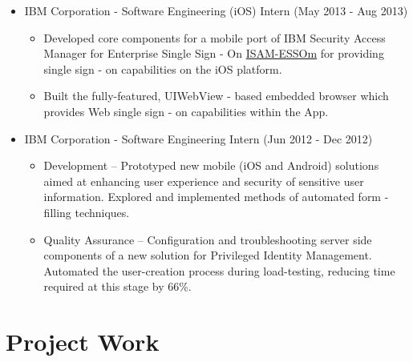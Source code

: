\begin{itemize}
\tightlist
\item
  IBM Corporation - Software Engineering (iOS) Intern \hfill (May 2013 -
  Aug 2013)

  \begin{itemize}
  \tightlist
  \item
    Developed core components for a mobile port of IBM Security Access
    Manager for Enterprise Single Sign - On
    \href{https://itunes.apple.com/us/app/isam-essom/id741972716?mt=8}{ISAM-ESSOm}
    for providing single sign - on capabilities on the iOS platform.
  \item
    Built the fully-featured, UIWebView - based embedded browser which
    provides Web single sign - on capabilities within the App.
  \end{itemize}
\item
  IBM Corporation - Software Engineering Intern \hfill (Jun 2012 - Dec
  2012)

  \begin{itemize}
  \tightlist
  \item
    Development -- Prototyped new mobile (iOS and Android) solutions
    aimed at enhancing user experience and security of sensitive user
    information. Explored and implemented methods of automated form -
    filling techniques.
  \item
    Quality Assurance -- Configuration and troubleshooting server side
    components of a new solution for Privileged Identity Management.
    Automated the user-creation process during load-testing, reducing
    time required at this stage by 66\%.
  \end{itemize}
\end{itemize}

\section{Project Work}\label{project-work}

